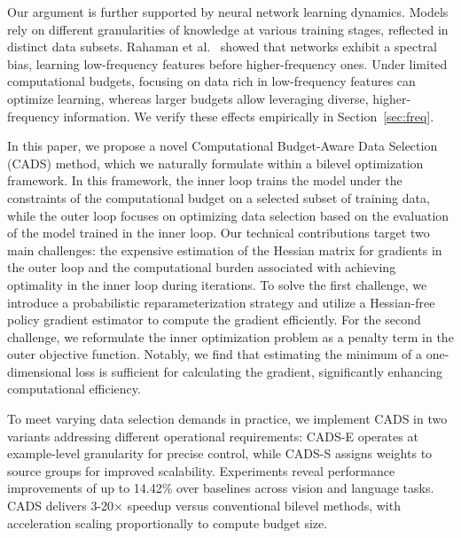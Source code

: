 Our argument is further supported by neural network learning dynamics. Models rely on different granularities of knowledge at various training stages, reflected in distinct data subsets. Rahaman et al.~\cite{Rahaman2018OnTS} showed that networks exhibit a spectral bias, learning low-frequency features before higher-frequency ones. Under limited computational budgets, focusing on data rich in low-frequency features can optimize learning, whereas larger budgets allow leveraging diverse, higher-frequency information. We verify these effects empirically in Section~\ref{sec:freq}.

In this paper, we propose a novel Computational Budget-Aware Data Selection (CADS) method, which we naturally formulate within a bilevel optimization framework. In this framework, the inner loop trains the model under the constraints of the computational budget on a selected subset of training data, while the outer loop focuses on optimizing data selection based on the evaluation of the model trained in the inner loop.
Our technical contributions target two main challenges: the expensive estimation of the Hessian matrix for gradients in the outer loop and the computational burden associated with achieving optimality in the inner loop during iterations. To solve the first challenge, we introduce a probabilistic reparameterization strategy and utilize a Hessian-free policy gradient estimator to compute the gradient efficiently. For the second challenge, we reformulate the inner optimization problem as a penalty term in the outer objective function. Notably, we find that estimating the minimum of a one-dimensional loss is sufficient for calculating the gradient, significantly enhancing computational efficiency.

To meet varying data selection demands in practice, we implement CADS in two variants addressing different operational requirements: CADS-E operates at example-level granularity for precise control, while CADS-S assigns weights to source groups for improved scalability. Experiments reveal performance improvements of up to 14.42\% over baselines across vision and language tasks. CADS delivers 3-20× speedup versus conventional bilevel methods, with acceleration scaling proportionally to compute budget size.


